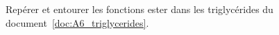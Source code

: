 \numeroQuestion
Repérer et entourer les fonctions ester dans les triglycérides du document~\ref{doc:A6_triglycerides}.



  


